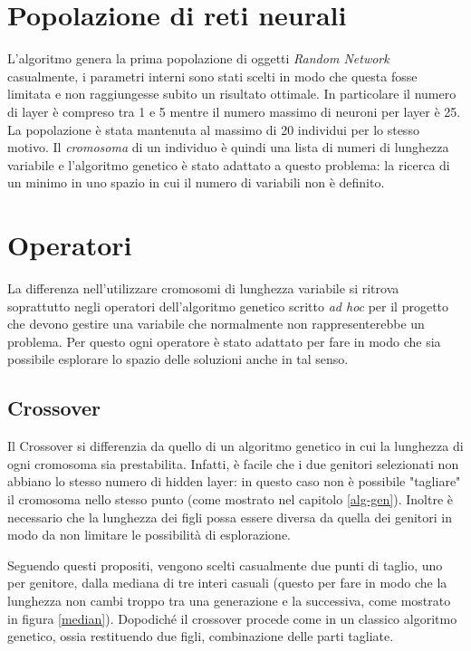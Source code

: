 \documentclass[12pt,a4paper]{report}
\begin{document}
\section{Popolazione di reti neurali}

L'algoritmo genera la prima popolazione di oggetti \textit{Random Network} casualmente, i parametri interni sono stati scelti in modo che questa fosse limitata e non raggiungesse subito un risultato ottimale.
In particolare il numero di layer è compreso tra 1 e 5 mentre il numero massimo di neuroni per layer è 25.
La popolazione è stata mantenuta al massimo di 20 individui per lo stesso motivo.
Il \textit{cromosoma} di un individuo è quindi una lista di numeri di lunghezza variabile e l'algoritmo genetico è stato adattato a questo problema: la ricerca di un minimo in uno spazio in cui il numero di variabili non è definito.

\section{Operatori}

La differenza nell'utilizzare cromosomi di lunghezza variabile si ritrova soprattutto negli operatori dell'algoritmo genetico scritto \textit{ad hoc} per il progetto che devono gestire una variabile che normalmente non rappresenterebbe un problema. 
Per questo ogni operatore è stato adattato per fare in modo che sia possibile esplorare lo spazio delle soluzioni anche in tal senso.

\subsection{Crossover}

Il Crossover si differenzia da quello di un algoritmo genetico in cui la lunghezza di ogni cromosoma sia prestabilita. 
Infatti, è facile che i due genitori selezionati non abbiano lo stesso numero di hidden layer: in questo caso non è possibile "tagliare" il cromosoma nello stesso punto (come mostrato nel capitolo \ref{alg-gen}).
Inoltre è necessario che la lunghezza dei figli possa essere diversa da quella dei genitori in modo da non limitare le possibilità di esplorazione.

Seguendo questi propositi, vengono scelti casualmente due punti di taglio, uno per genitore, dalla mediana di tre interi casuali (questo per fare in modo che la lunghezza non cambi troppo tra una generazione e la successiva, come mostrato in figura \ref{median}).
Dopodiché il crossover procede come in un classico algoritmo genetico, ossia restituendo due figli, combinazione delle parti tagliate.
\end{document}
